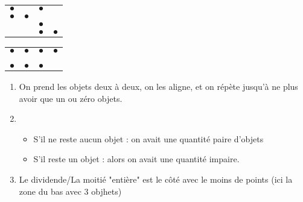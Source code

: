 \documentclass[11pt,a4paper]{article}
\begin{document}
\begin{table}[h!]
  \centering
  \begin{minipage}{0.4\textwidth}
    \centering

    \begin{tabular}{  C{1cm}  C{1cm}  C{1cm}  C{1cm}  }
$ \bullet $ & & $ \bullet $ & \\
$ \bullet $ & $ \bullet $ & & \\
 & & $ \bullet $ & \\
 & & $ \bullet $ & $ \bullet $ \\
    \end{tabular}

  \end{minipage}
  \hfillx
  \begin{minipage}{0.2\textwidth}
  \centering


  \end{minipage}
  \hfillx
  \begin{minipage}{0.4\textwidth}
    \centering

    \begin{tabular}{  C{1cm}  C{1cm}  C{1cm}  C{1cm}  }
$ \bullet $ & $ \bullet $ & $ \bullet $ & $ \bullet $ \\
 & & & \\
\hline
 & & & \\
$ \bullet $ & $ \bullet $ & $ \bullet $ &  \\
    \end{tabular}

  \end{minipage}
\end{table}

\begin{enumerate}
\item On prend les objets deux à deux, on les aligne, et on répète jusqu'à ne plus avoir que un ou zéro objets.
\item \begin{itemize}
      \item S'il ne reste aucun objet : on avait une quantité paire d'objets
      \item S'il reste un objet : alors on avait une quantité impaire.
      \end{itemize}
\item Le dividende/La moitié "entière" est le côté avec le moins de points (ici la zone du bas avec 3 objhets)
\end{enumerate}
\end{document}
